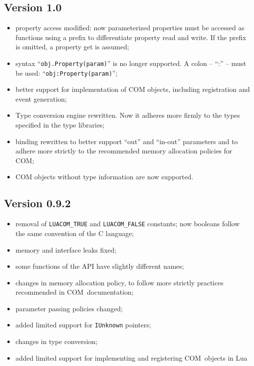 \documentclass[11pt,a4paper,english]{report}
\newcommand{\ident}[1]{\mbox{\texttt{#1}}}
\newcommand{\techname}[1]{\mbox{#1}}
\newcommand{\lua}{\techname{Lua}}
\newcommand{\com}{\techname{COM}}
\begin{document}
\subsection*{Version 1.0}

\begin{itemize}
\item property access modified: now parameterized properties must be
accessed as functions using a prefix to differentiate property read
and write. If the prefix is omitted, a property get is assumed;

\item syntax ``\verb+obj.Property(param)+'' is no longer supported. A
colon -- ``:'' -- must be used: ``\verb+obj:Property(param)+'';

\item better support for implementation of COM objects, including
registration and event generation;

\item Type conversion engine rewritten. Now it adheres more firmly to
the types specified in the type libraries;

\item binding rewritten to better support ``out'' and ``in-out''
parameters and to adhere more strictly to the recommended memory
allocation policies for COM;

\item COM objects without type information are now supported.
\end{itemize}

\subsection*{Version 0.9.2}

\begin{itemize}
\item removal of \ident{LUACOM\_TRUE} and \ident{LUACOM\_FALSE}
constants; now booleans follow the same convention of the C language;
\item memory and interface leaks fixed;
\item some functions of the API have slightly different names;
\item changes in memory allocation policy, to follow more strictly
practices recommended in \com\ documentation;
\item parameter passing policies changed;
\item added limited support for \ident{IUnknown} pointers;
\item changes in type conversion;
\item added limited support for implementing and registering \com\
objects in \lua
\end{itemize}
\end{document}
